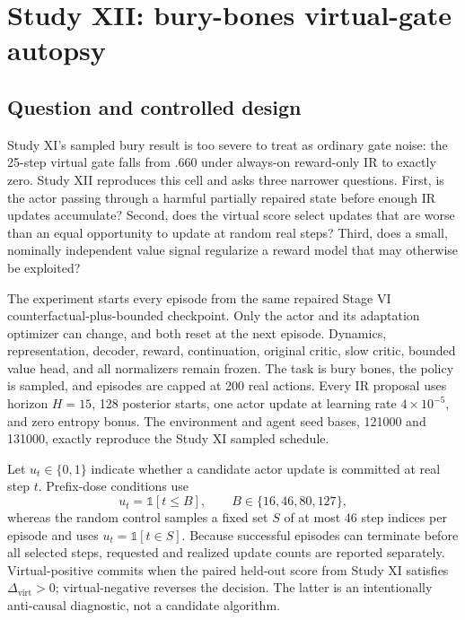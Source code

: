 \documentclass[10pt]{article}
\begin{document}
\section{Study XII: bury-bones virtual-gate autopsy}

\subsection{Question and controlled design}

Study XI's sampled bury result is too severe to treat as ordinary gate noise:
the 25-step virtual gate falls from $.660$ under always-on reward-only IR to
exactly zero. Study XII reproduces this cell and asks three narrower questions.
First, is the actor passing through a harmful partially repaired state before
enough IR updates accumulate? Second, does the virtual score select updates
that are worse than an equal opportunity to update at random real steps?
Third, does a small, nominally independent value signal regularize a reward
model that may otherwise be exploited?

The experiment starts every episode from the same repaired Stage VI
counterfactual-plus-bounded checkpoint. Only the actor and its adaptation
optimizer can change, and both reset at the next episode. Dynamics,
representation, decoder, reward, continuation, original critic, slow critic,
bounded value head, and all normalizers remain frozen. The task is bury bones,
the policy is sampled, and episodes are capped at 200 real actions. Every IR
proposal uses horizon $H=15$, 128 posterior starts, one actor update at learning
rate $4\times10^{-5}$, and zero entropy bonus. The environment and agent seed
bases, 121000 and 131000, exactly reproduce the Study XI sampled schedule.

Let $u_t\in\{0,1\}$ indicate whether a candidate actor update is committed at
real step $t$. Prefix-dose conditions use
\begin{equation}
  u_t=\mathbb{1}[t\leq B],\qquad B\in\{16,46,80,127\},
\end{equation}
whereas the random control samples a fixed set $S$ of at most 46 step indices
per episode and uses $u_t=\mathbb{1}[t\in S]$. Because successful episodes can
terminate before all selected steps, requested and realized update counts are
reported separately. Virtual-positive commits when the paired held-out score
from Study XI satisfies $\Delta_{\mathrm{virt}}>0$; virtual-negative reverses
the decision. The latter is an intentionally anti-causal diagnostic, not a
candidate algorithm.
\end{document}
